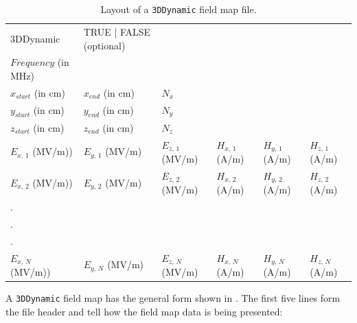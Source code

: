 \begin{table}[ht!]
    \caption{Layout of a \texttt{3DDynamic} field map file.}
    \label{tab:3DDynamic}
    \begin{center}
    \begin{tabular}{llllll}
      \hline
      3DDynamic            & TRUE | FALSE (optional) &                 &                   &                   &                   \\
      $Frequency$ (in MHz) &                    &                    &                   &                   &                   \\
      $x_{start}$ (in cm)  & $x_{end}$ (in cm)  & $N_{x}$            &                   &                   &                   \\
      $y_{start}$ (in cm)  & $y_{end}$ (in cm)  & $N_{y}$            &                   &                   &                   \\
      $z_{start}$ (in cm)  & $z_{end}$ (in cm)  & $N_{z}$            &                   &                   &                   \\
      $E_{x,\,1}$ (MV/m))  & $E_{y,\,1}$ (MV/m) & $E_{z,\,1}$ (MV/m) & $H_{x,\,1}$ (A/m) & $H_{y,\,1}$ (A/m) & $H_{z,\,1}$ (A/m) \\
      $E_{x,\,2}$ (MV/m))  & $E_{y,\,2}$ (MV/m) & $E_{z,\,2}$ (MV/m) & $H_{x,\,2}$ (A/m) & $H_{y,\,2}$ (A/m) & $H_{z,\,2}$ (A/m) \\
      .                    &                    &                    &                   &                   &                   \\
      .                    &                    &                    &                   &                   &                   \\
      .                    &                    &                    &                   &                   &                   \\
      $E_{x,\,N}$ (MV/m))  & $E_{y,\,N}$ (MV/m) & $E_{z,\,N}$ (MV/m) & $H_{x,\,N}$ (A/m) & $H_{y,\,N}$ (A/m) & $H_{z,\,N}$ (A/m) \\
      \hline
    \end{tabular}
    \end{center}
\end{table}

A \texttt{3DDynamic} field map has the general form shown in . The first five lines form
the file header and tell \opalt how the field map data is being presented:

